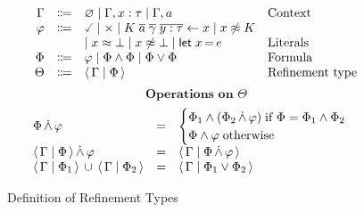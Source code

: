 \begin{figure}[htbp]
	\caption{Definition of Refinement Types}
	\label{fig:refinementTypes}
	\centering
	\[
		\begin{array}{rcll}
			\Gamma  & \Coloneqq & \varnothing \mid \Gamma, x:\tau \mid \Gamma, a                                                                                                  & \text{Context}         \\
			\varphi & \Coloneqq & \true \mid \false \mid \ctcon{\genconapp{K}{a}{\gamma}{y:\tau}}{x} \mid x \ntermeq K \\
			        &           & \mid x \termeq \bot \mid x \ntermeq \bot \mid \ctlet{x}{e} & \text{Literals}        \\
			\Phi    & \Coloneqq & \varphi \mid \Phi \wedge \Phi \mid \Phi \vee \Phi                                                                                               & \text{Formula}         \\
			\Theta  & \Coloneqq & \reft{\Gamma}{\Phi}                                                                                                                             & \text{Refinement type} \\
		\end{array}
	\]
    \[ \textbf{Operations on $\Theta$} \]
    \[
    \begin{array}{lcl}
        \Phi \,\dot{\wedge}\, \varphi &=&
        \begin{cases}
            \Phi_1 \wedge (\Phi_2 \,\dot{\wedge}\, \varphi) \; \textrm{if }\Phi = \Phi_1 \wedge \Phi_2 \\
            \Phi \wedge \varphi \; \textrm{otherwise} \\
        \end{cases}\\
        \langle \, \Gamma \mid \Phi \, \rangle \,\dot{\wedge}\, \varphi &=&
            \langle \, \Gamma \mid \Phi \,\dot{\wedge}\, \varphi \, \rangle\\
        \langle \, \Gamma \mid \Phi_1 \, \rangle \,\cup\, \langle \, \Gamma \mid \Phi_2 \, \rangle &=& \langle \, \Gamma \mid \Phi_1 \vee \Phi_2 \, \rangle \\
    \end{array}
    \]
\end{figure}

